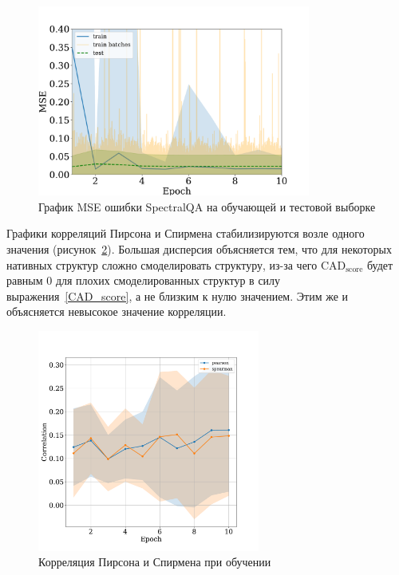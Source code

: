 \documentclass[14pt]{extarticle}
\begin{document}
\begin{figure}[H]
		\centering
		\includegraphics[width=0.8\textwidth]{training_smallset.pdf}
		\caption{График MSE ошибки SpectralQA на обучающей и тестовой выборке}
		\label{fig:GCN}
	\end{figure}
Графики корреляций Пирсона и Спирмена стабилизируются возле одного значения (рисунок~\ref{fig:correlation}). Большая дисперсия объясняется тем, что для некоторых нативных структур сложно смоделировать структуру, из-за чего $\text{CAD}_\text{score}$ будет равным 0 для плохих смоделированных структур в силу выражения~\eqref{CAD_score}, а не близким к нулю значением. Этим же и объясняется невысокое значение корреляции.
\begin{figure}[h]
		\centering
		\includegraphics[width=0.65\textwidth]{training_correlations_smallsettt.pdf}
		\caption{Корреляция Пирсона и Спирмена при обучении}
		\label{fig:correlation}
\end{figure}
\end{document}
